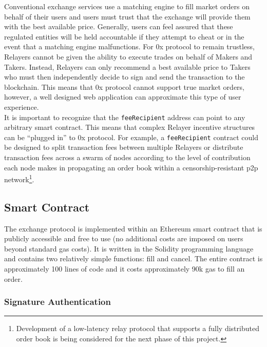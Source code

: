\documentclass[10pt]{article}
\begin{document}
\noindent Conventional exchange services use a matching engine to fill market orders on behalf of their users and users must trust that the exchange will provide them with the best available price. Generally, users can feel assured that these regulated entities will be held accountable if they attempt to cheat or in the event that a matching engine malfunctions. For 0x protocol to remain trustless, Relayers cannot be given the ability to execute trades on behalf of Makers and Takers. Instead, Relayers can only recommend a best available price to Takers who must then independently decide to sign and send the transaction to the blockchain. This means that 0x protocol cannot support true market orders, however, a well designed web application can approximate this type of user experience. \\ 

\noindent It is important to recognize that the \texttt{feeRecipient} address can point to any arbitrary smart contract. This means that complex Relayer incentive structures can be ``plugged in'' to 0x protocol. For example, a \texttt{feeRecipient} contract could be designed to split transaction fees between multiple Relayers or distribute transaction fees across a swarm of nodes according to the level of contribution each node makes in propagating an order book within a censorship-resistant p2p network\footnote{ Development of a low-latency relay protocol that supports a fully distributed order book is being considered for the next phase of this project.}.

\clearpage

\pagebreak

\subsection{Smart Contract}

The exchange protocol is implemented within an Ethereum smart contract that is publicly accessible and free to use (no additional costs are imposed on users beyond standard gas costs). It is written in the Solidity programming language and contains two relatively simple functions: fill and cancel. The entire contract is approximately 100 lines of code and it costs approximately 90k gas to fill an order.

\subsubsection{Signature Authentication}
\end{document}

